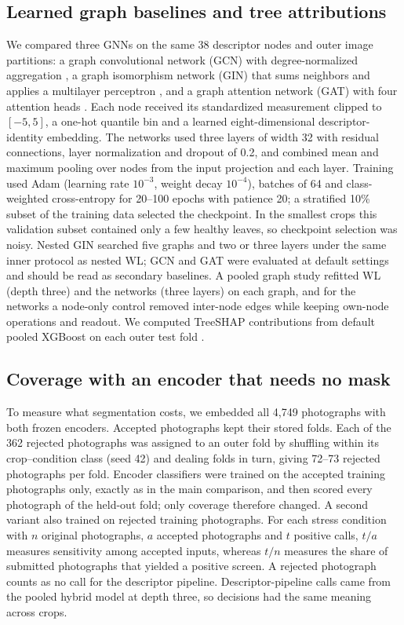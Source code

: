 \subsection{Learned graph baselines and tree attributions}
We compared three GNNs on the same 38 descriptor nodes and outer image partitions: a graph convolutional network (GCN) with degree-normalized aggregation \citep{Kipf2017}, a graph isomorphism network (GIN) that sums neighbors and applies a multilayer perceptron \citep{Xu2019}, and a graph attention network (GAT) with four attention heads \citep{Velickovic2018}. Each node received its standardized measurement clipped to $[-5,5]$, a one-hot quantile bin and a learned eight-dimensional descriptor-identity embedding. The networks used three layers of width 32 with residual connections, layer normalization and dropout of 0.2, and combined mean and maximum pooling over nodes from the input projection and each layer. Training used Adam (learning rate $10^{-3}$, weight decay $10^{-4}$), batches of 64 and class-weighted cross-entropy for 20--100 epochs with patience 20; a stratified 10\% subset of the training data selected the checkpoint. In the smallest crops this validation subset contained only a few healthy leaves, so checkpoint selection was noisy. Nested GIN searched five graphs and two or three layers under the same inner protocol as nested WL; GCN and GAT were evaluated at default settings and should be read as secondary baselines. A pooled graph study refitted WL (depth three) and the networks (three layers) on each graph, and for the networks a node-only control removed inter-node edges while keeping own-node operations and readout. We computed TreeSHAP contributions from default pooled XGBoost on each outer test fold \citep{Lundberg2020}.

\subsection{Coverage with an encoder that needs no mask}
\label{sec:coverage-methods}
To measure what segmentation costs, we embedded all 4,749 photographs with both frozen encoders. Accepted photographs kept their stored folds. Each of the 362 rejected photographs was assigned to an outer fold by shuffling within its crop--condition class (seed 42) and dealing folds in turn, giving 72--73 rejected photographs per fold. Encoder classifiers were trained on the accepted training photographs only, exactly as in the main comparison, and then scored every photograph of the held-out fold; only coverage therefore changed. A second variant also trained on rejected training photographs. For each stress condition with $n$ original photographs, $a$ accepted photographs and $t$ positive calls, $t/a$ measures sensitivity among accepted inputs, whereas $t/n$ measures the share of submitted photographs that yielded a positive screen. A rejected photograph counts as no call for the descriptor pipeline. Descriptor-pipeline calls came from the pooled hybrid model at depth three, so decisions had the same meaning across crops.


